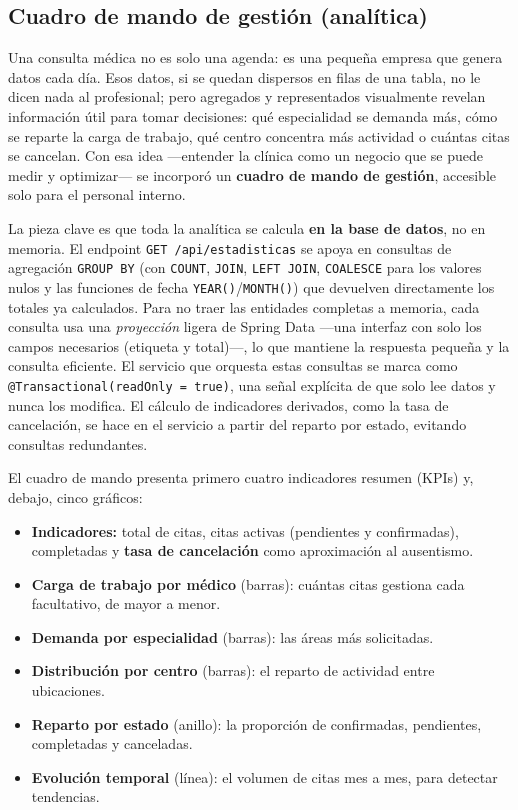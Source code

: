 \documentclass[12pt,a4paper]{report}
\begin{document}
\subsection{Cuadro de mando de gestión (analítica)}

Una consulta médica no es solo una agenda: es una pequeña empresa que genera datos cada día. Esos datos, si se quedan dispersos en filas de una tabla, no le dicen nada al profesional; pero agregados y representados visualmente revelan información útil para tomar decisiones: qué especialidad se demanda más, cómo se reparte la carga de trabajo, qué centro concentra más actividad o cuántas citas se cancelan. Con esa idea —entender la clínica como un negocio que se puede medir y optimizar— se incorporó un \textbf{cuadro de mando de gestión}, accesible solo para el personal interno.

La pieza clave es que toda la analítica se calcula \textbf{en la base de datos}, no en memoria. El endpoint \texttt{GET /api/estadisticas} se apoya en consultas de agregación \texttt{GROUP BY} (con \texttt{COUNT}, \texttt{JOIN}, \texttt{LEFT JOIN}, \texttt{COALESCE} para los valores nulos y las funciones de fecha \texttt{YEAR()}/\texttt{MONTH()}) que devuelven directamente los totales ya calculados. Para no traer las entidades completas a memoria, cada consulta usa una \emph{proyección} ligera de Spring Data —una interfaz con solo los campos necesarios (etiqueta y total)—, lo que mantiene la respuesta pequeña y la consulta eficiente. El servicio que orquesta estas consultas se marca como \texttt{@Transactional(readOnly = true)}, una señal explícita de que solo lee datos y nunca los modifica. El cálculo de indicadores derivados, como la tasa de cancelación, se hace en el servicio a partir del reparto por estado, evitando consultas redundantes.

El cuadro de mando presenta primero cuatro indicadores resumen (KPIs) y, debajo, cinco gráficos:

\begin{itemize}
  \item \textbf{Indicadores:} total de citas, citas activas (pendientes y confirmadas), completadas y \textbf{tasa de cancelación} como aproximación al ausentismo.
  \item \textbf{Carga de trabajo por médico} (barras): cuántas citas gestiona cada facultativo, de mayor a menor.
  \item \textbf{Demanda por especialidad} (barras): las áreas más solicitadas.
  \item \textbf{Distribución por centro} (barras): el reparto de actividad entre ubicaciones.
  \item \textbf{Reparto por estado} (anillo): la proporción de confirmadas, pendientes, completadas y canceladas.
  \item \textbf{Evolución temporal} (línea): el volumen de citas mes a mes, para detectar tendencias.
\end{itemize}
\end{document}

